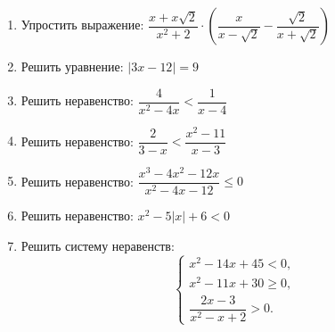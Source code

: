 \documentclass[12pt, a5paper]{article}
\begin{document}
	
 \cfoot{}
\begin{enumerate}
	\item Упростить выражение: $\dfrac{x+x\sqrt{2}}{x^2+2}\cdot\left(\dfrac{x}{x-\sqrt{2}}-\dfrac{\sqrt{2}}{x+\sqrt{2}}\right)$
	\item Решить уравнение: $|3x-12|=9$
	\item Решить неравенство: $\dfrac{4}{x^2-4x}<\dfrac{1}{x-4}$
	\item Решить неравенство: $\dfrac{2}{3-x}<\dfrac{x^2-11}{x-3}$
	\item Решить неравенство: $\dfrac{x^3-4x^2-12x}{x^2-4x-12}\leq 0$
	\item Решить неравенство: $x^2-5|x|+6<0$
	\item Решить систему неравенств:
	$$\left\{
	\begin{array}{l}
		x^2-14x+45<0,\\
		x^2-11x+30\geq0,\\
		\dfrac{2x-3}{x^2-x+2}>0.
	\end{array}
	\right.$$
\end{enumerate}
\end{document}

